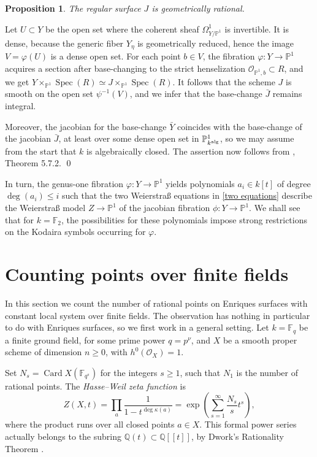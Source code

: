 \documentclass[oneside, 12pt]{amsart}
\newcommand\mylabel[1]{\label{#1}\marginpar{\vspace{-1ex}\medskip\medskip\footnotesize \tt #1}}
\renewcommand\mylabel[1]{\label{#1}}
\newtheorem{proposition}[theorem]{Proposition}
\theoremstyle{definition}
\theoremstyle{remark}
\newcommand{\QQ}{\mathbb{Q}}
\newcommand{\FF}{\mathbb{F}}
\newcommand{\PP}{\mathbb{P}}
\newcommand{\alg}{\text{\rm alg}}
\newcommand{\Card}{\operatorname{Card}}
\renewcommand{\O}{\mathscr{O}}
\newcommand{\ra}{\rightarrow}
\newcommand{\Spec}{\operatorname{Spec}}
\newcommand{\bY}{{\bar{Y}}}
\newcommand{\bJ}{{\bar{J}}}
\begin{document}
\begin{proposition}
\mylabel{jacobian geometrically rational}
The regular surface $J$ is geometrically rational.
\end{proposition}

\proof
Let $U\subset Y$ be the open set where the coherent sheaf $\Omega^1_{Y/\PP^1}$ is invertible.
It is dense, because the generic fiber $Y_\eta$ is geometrically reduced, hence the image
$V=\varphi(U)$ is a dense open set. 
For each point $b\in V$, the fibration $\varphi:Y\ra\PP^1$ acquires a section after base-changing
to the strict henselization  $\O_{\PP^1,b}\subset R$, and we get $Y\times_{\PP^1}\Spec(R)\simeq J\times_{\PP^1}\Spec(R)$.
It follows that the scheme $J$ is smooth on the open set $\psi^{-1}(V)$, and we infer that the base-change $\bJ$ remains integral.

Moreover, the jacobian for the base-change $\bY$ coincides with the base-change of the jacobian $\bJ$, at least over some
dense open set in $\PP^1_{k^\alg}$, so we may assume from the start that $k$ is algebraically closed.
The assertion now follows from \cite{Cossec; Dolgachev 1989}, Theorem 5.7.2.
\qed

\medskip
In turn, the genus-one fibration $\varphi:Y\ra \PP^1$ yields polynomials $a_i\in k[t]$ of degree $\deg(a_i)\leq i$
such that the two Weierstra\ss{} equations in \eqref{two equations} describe the Weierstra\ss{} model $Z\ra \PP^1$
of the jacobian fibration $\phi:Y\ra\PP^1$. We shall see that for $k=\FF_2$, the possibilities for these polynomials
impose
strong restrictions on the Kodaira symbols occurring for $\varphi$.


\section{Counting points over finite fields}
\mylabel{Counting points}

In this section we count the number of rational points  on Enriques surfaces  with constant local system over finite fields.
The observation has nothing in particular to do with Enriques surfaces, so we first work in a general setting.
Let $k=\FF_q$ be a finite ground field, for some prime power $q=p^\nu$, and   $X$ be a smooth proper scheme of dimension $n\geq 0$,
with $h^0(\O_X)=1$.

Set $N_s=\Card X(\FF_{q^s})$ for  the integers $s\geq 1$, such that $N_1$ is the number of rational points.
The \emph{Hasse--Weil zeta function} is 
\begin{equation}
\label{zeta function}
Z(X,t) = \prod_a \frac{1}{1-t^{\deg\kappa(a)}} =\exp\left(\sum_{s=1}^\infty \frac{N_s }{s}t^s\right),
\end{equation}
where the product runs over all closed points $a\in X$. This formal power series actually belongs to
the subring $\QQ(t)\subset\QQ[[t]]$, by Dwork's Rationality Theorem \cite{Dwork 1960}.
\end{document}
